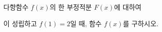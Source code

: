 다항함수 $f(x)$의 한 부정적분 $F(x)$에 대하여 \par\smallskip{}\par\smallskip\noindent 이 성립하고 $f(1)=2$일 때, 함수 $f(x)$를 구하시오.
